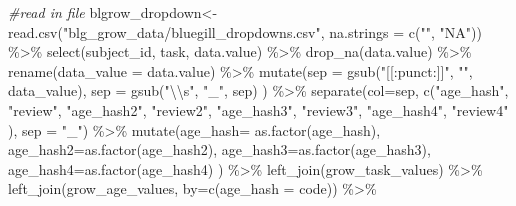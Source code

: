 \documentclass[
]{article}
\newenvironment{Shaded}{\begin{snugshade}}{\end{snugshade}}
\newcommand{\AttributeTok}[1]{\textcolor[rgb]{0.77,0.63,0.00}{#1}}
\newcommand{\CommentTok}[1]{\textcolor[rgb]{0.56,0.35,0.01}{\textit{#1}}}
\newcommand{\FunctionTok}[1]{\textcolor[rgb]{0.00,0.00,0.00}{#1}}
\newcommand{\NormalTok}[1]{#1}
\newcommand{\OtherTok}[1]{\textcolor[rgb]{0.56,0.35,0.01}{#1}}
\newcommand{\SpecialCharTok}[1]{\textcolor[rgb]{0.00,0.00,0.00}{#1}}
\newcommand{\StringTok}[1]{\textcolor[rgb]{0.31,0.60,0.02}{#1}}
\begin{document}
\begin{Shaded}
\begin{Highlighting}[]
\CommentTok{\#read in file }
\NormalTok{blgrow\_dropdown}\OtherTok{\textless{}{-}}\FunctionTok{read.csv}\NormalTok{(}\StringTok{"blg\_grow\_data/bluegill\_dropdowns.csv"}\NormalTok{, }\AttributeTok{na.strings =} \FunctionTok{c}\NormalTok{(}\StringTok{""}\NormalTok{, }\StringTok{"NA"}\NormalTok{)) }\SpecialCharTok{\%\textgreater{}\%}
  \FunctionTok{select}\NormalTok{(subject\_id, task, }\StringTok{\textquotesingle{}data.value\textquotesingle{}}\NormalTok{) }\SpecialCharTok{\%\textgreater{}\%}
  \FunctionTok{drop\_na}\NormalTok{(}\StringTok{\textquotesingle{}data.value\textquotesingle{}}\NormalTok{) }\SpecialCharTok{\%\textgreater{}\%} 
  \FunctionTok{rename}\NormalTok{(}\AttributeTok{data\_value =} \StringTok{\textquotesingle{}data.value\textquotesingle{}}\NormalTok{) }\SpecialCharTok{\%\textgreater{}\%} 
  \FunctionTok{mutate}\NormalTok{(}\AttributeTok{sep =} \FunctionTok{gsub}\NormalTok{(}\StringTok{"[[:punct:]]"}\NormalTok{, }\StringTok{""}\NormalTok{, data\_value), }
         \AttributeTok{sep =} \FunctionTok{gsub}\NormalTok{(}\StringTok{"}\SpecialCharTok{\textbackslash{}\textbackslash{}}\StringTok{s"}\NormalTok{, }\StringTok{"\_"}\NormalTok{, sep)}
\NormalTok{  ) }\SpecialCharTok{\%\textgreater{}\%} 
  \FunctionTok{separate}\NormalTok{(}\AttributeTok{col=}\NormalTok{sep, }\FunctionTok{c}\NormalTok{(}\StringTok{"age\_hash"}\NormalTok{, }\StringTok{"review"}\NormalTok{, }\StringTok{"age\_hash2"}\NormalTok{, }\StringTok{"review2"}\NormalTok{, }\StringTok{"age\_hash3"}\NormalTok{, }\StringTok{"review3"}\NormalTok{, }\StringTok{"age\_hash4"}\NormalTok{, }\StringTok{"review4"}\NormalTok{ ), }\AttributeTok{sep =} \StringTok{"\_"}\NormalTok{) }\SpecialCharTok{\%\textgreater{}\%} 
  \FunctionTok{mutate}\NormalTok{(}\AttributeTok{age\_hash=} \FunctionTok{as.factor}\NormalTok{(age\_hash),}
          \AttributeTok{age\_hash2=}\FunctionTok{as.factor}\NormalTok{(age\_hash2),}
          \AttributeTok{age\_hash3=}\FunctionTok{as.factor}\NormalTok{(age\_hash3),}
          \AttributeTok{age\_hash4=}\FunctionTok{as.factor}\NormalTok{(age\_hash4) ) }\SpecialCharTok{\%\textgreater{}\%} 
  \FunctionTok{left\_join}\NormalTok{(grow\_task\_values) }\SpecialCharTok{\%\textgreater{}\%} 
  \FunctionTok{left\_join}\NormalTok{(grow\_age\_values, }\AttributeTok{by=}\FunctionTok{c}\NormalTok{(}\StringTok{\textquotesingle{}age\_hash\textquotesingle{}} \OtherTok{=} \StringTok{\textquotesingle{}code\textquotesingle{}}\NormalTok{)) }\SpecialCharTok{\%\textgreater{}\%} 

\end{Highlighting}
\end{Shaded}
\end{document}
